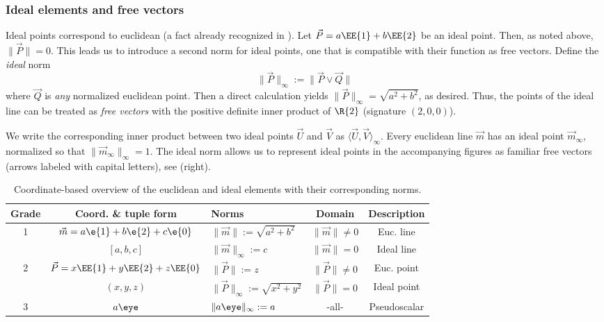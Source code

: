 \documentclass{birkjour}
\begin{document}
\subsubsection{Ideal elements and free vectors} Ideal points correspond to euclidean  (a fact already recognized in \cite{clifford73}). Let  $\vec{P} = a \EE{1} + b\EE{2}$ be an ideal point. Then, as noted above, $\| \vec{P} \| = 0$.  This leads us to  introduce a second norm for ideal points, one that is compatible with their function as free vectors.   Define the \emph{ideal} norm \[\| \vec{P} \|_{\infty} := \| \vec{P} \vee \vec{Q}\|\] where $\vec{Q}$ is \emph{any} normalized euclidean point. Then a direct calculation yields $\| \vec{P} \|_{\infty} = \sqrt{a^{2}+b^{2}}$, as desired.  Thus, the points of the ideal line can be treated as \emph{free vectors} with the  positive definite inner product of $\R{2}$ (signature $(2,0,0)$).   

We write the corresponding inner product between two ideal points $\vec{U}$ and $\vec{V}$ as $\langle \vec{U}, \vec{V} \rangle_{\infty}$.  Every euclidean line $\vec{m}$ has an ideal point $\vec{m}_{\infty}$,  normalized so that $\| \vec{m}_{\infty}\|_{\infty} = 1$.
The ideal norm allows us to represent ideal points  in the accompanying figures as familiar free vectors (arrows labeled with capital letters), see  (right).  

\begin{table}[t]
\begin{centering}
\renewcommand{\arraystretch}{1.25}
\begin{tabular}{| c | c |  l  |  c | c |}\hline
\textbf{Grade} &  \textbf{Coord. \& tuple form} & \textbf{Norms} & \textbf{Domain} & \textbf{Description} \\ \hline
1 	& {\small $\vec{m} = a \e{1} + b \e{2} + c\e{0} $} & $\|\vec{m}\| := \sqrt{a^2+b^2}$ & $\| \vec{m} \| \neq 0$ & Euc. line \\ \cline{3-5}
 	&  $[a, b, c]$ & $\|\vec{m}\|_\infty := c$ & $\| \vec{m} \| = 0$ & Ideal line \\ \hline
2 	& {\small $\vec{P} = x \EE{1} + y \EE{2} + z\EE{0}$} & $\|\vec{P}\| := z$ & $\| \vec{P} \| \neq 0$ & Euc. point\\ \cline{3-5}
 	&  $(x,y,z)$  & $\|\vec{P}\|_\infty :=\sqrt{x^2+y^2}$ & $\| \vec{P} \| = 0$ & Ideal point  \\ \hline
3 	& $a\eye$  & $\|a\eye\|_\infty :=a$ & -all- & Pseudoscalar \\ \hline
\end{tabular}
\vspace{.1in}
\caption{Coordinate-based overview of the euclidean and ideal elements with their corresponding norms.}
\label{tab:overview}
\end{centering}
\end{table}
\end{document}
